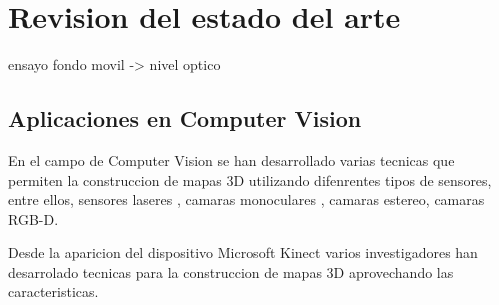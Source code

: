 \chapter{Revision del estado del arte}

ensayo fondo movil -> nivel optico


\section{Aplicaciones en Computer Vision}

En el campo de Computer Vision se han desarrollado varias tecnicas que permiten la construccion de mapas 3D utilizando difenrentes tipos de sensores, entre ellos, sensores laseres \cite{chou2013robotic}, camaras monoculares \cite{tomono2009robust}, camaras estereo, camaras RGB-D.

Desde la aparicion del dispositivo Microsoft Kinect varios investigadores han desarrolado tecnicas para la construccion de mapas 3D aprovechando las caracteristicas.